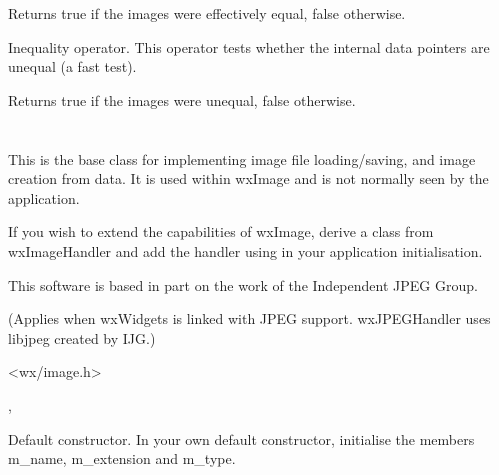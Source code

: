 
Returns true if the images were effectively equal, false otherwise.


\label{wximagenotequal}


Inequality operator. This operator tests whether the internal data pointers are
unequal (a fast test).




Returns true if the images were unequal, false otherwise.

\section{}\label{wximagehandler}

This is the base class for implementing image file loading/saving, and image creation from data.
It is used within wxImage and is not normally seen by the application.

If you wish to extend the capabilities of wxImage, derive a class from wxImageHandler
and add the handler using  in your
application initialisation.


This software is based in part on the work of the Independent JPEG Group.

(Applies when wxWidgets is linked with JPEG support. wxJPEGHandler uses libjpeg
created by IJG.)




<wx/image.h>


, 



\label{wximagehandlerctor}


Default constructor. In your own default constructor, initialise the members
m\_name, m\_extension and m\_type.


